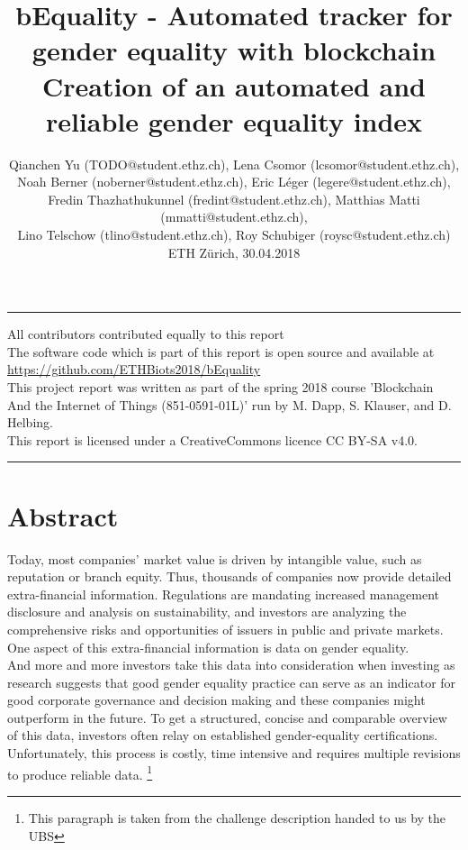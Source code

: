 \documentclass[portrait,a4paper]{article}
\title{bEquality - Automated tracker for gender equality with blockchain \\[-10pt] Creation of an automated and reliable gender equality index}
\author{Qianchen Yu (TODO@student.ethz.ch), Lena Csomor (lcsomor@student.ethz.ch), \\[-4pt] 
Noah Berner (noberner@student.ethz.ch), Eric Léger (legere@student.ethz.ch),\\[-4pt] 
Fredin Thazhathukunnel (fredint@student.ethz.ch), Matthias Matti (mmatti@student.ethz.ch), \\[-4pt] 
Lino Telschow (tlino@student.ethz.ch), Roy Schubiger (roysc@student.ethz.ch) \\[10pt] 
ETH Z\"urich, 30.04.2018 \\[-16pt]}
\date{}
\begin{document}
\maketitle

\vspace{1pt}
\hrule
\vspace{1pt}

\begin{center}
	All contributors contributed equally to this report\\[8pt]
	The software code which is part of this report is open source and available at \url{https://github.com/ETHBiots2018/bEquality}\\[8pt]
	This project report was written as part of the spring 2018 course 'Blockchain And the Internet of Things (851-0591-01L)' run by M. Dapp, S. Klauser, and D. Helbing.\\[8pt]
	This report is licensed under a CreativeCommons licence CC BY-SA v4.0.
\end{center}

\vspace{1pt}
\hrule
\vspace{1pt}

\section*{Abstract}
	Today, most companies' market value is driven by intangible value, such as reputation or branch equity. 
	Thus, thousands of companies now provide detailed extra-financial information. 
	Regulations are mandating increased management disclosure and analysis on sustainability, and investors 
	are analyzing the comprehensive risks and opportunities of issuers in public and private markets. 
	One aspect of this extra-financial information is data on gender equality.\\
	And more and more investors take this data into consideration when investing as research suggests 
	that good gender equality practice can serve as an indicator for good corporate governance and decision 
	making and these companies might outperform in the future.
	To get a structured, concise and comparable overview of this data, investors often relay on established 
	gender-equality certifications. Unfortunately, this process is costly, time intensive and requires 
	multiple revisions to produce reliable data. 
	\footnote{This paragraph is taken from the challenge description handed to us by the UBS}\\
\end{document}
